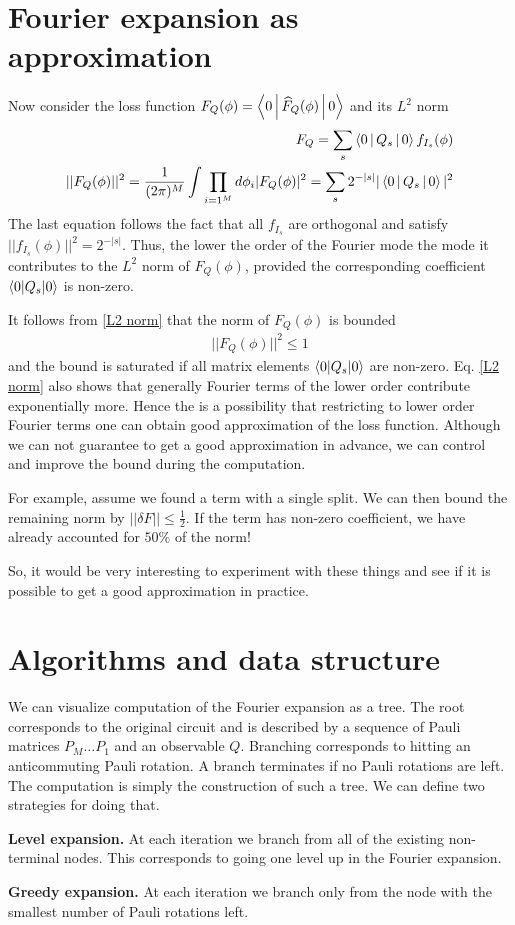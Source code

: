 \documentclass[12 pt]{article}
\begin{document}
\section{Fourier expansion as approximation}
Now consider the loss function $F_Q(\phi)=\Braket{0|\widehat{F}_Q(\phi)|0}$ and its $L^2$ norm
\begin{align}
	F_Q=\sum_s \Braket{0|Q_s|0} f_{I_s}(\phi)\\
	||F_Q(\phi)||^2=\frac{1}{(2\pi)^M}\int \prod_{i=1^M}d\phi_i|F_Q(\phi)|^2=\sum_s 2^{-|s|}|\Braket{0|Q_s|0}|^2  \label{L2 norm}
\end{align}
The last equation follows the fact that all $f_{I_s}$ are orthogonal and satisfy $||f_{I_s}(\phi)||^2=2^{-|s|}$.
Thus, the lower the order of the Fourier mode the mode it contributes to the $L^2$ norm of $F_Q(\phi)$, provided the corresponding coefficient $\braket{0|Q_s|0}$ is non-zero.

It follows from \eqref{L2 norm} that the norm of $F_Q(\phi)$ is bounded 
\begin{align}
	||F_Q(\phi)||^2\le 1
\end{align}
and the bound is saturated if all matrix elements $\braket{0|Q_s|0}$ are non-zero. Eq. \eqref{L2 norm} also shows that generally Fourier terms of the lower order contribute exponentially more. Hence the is a possibility that restricting to lower order Fourier terms one can obtain good approximation of the loss function. Although we can not guarantee to get a good approximation in advance, we can control and improve the bound during the computation.

For example, assume we found a term with a single split. We can then bound the remaining norm by $||\delta F||\le\frac12$. If the term has non-zero coefficient, we have already accounted for $50\%$ of the norm! 

So, it would be very interesting to experiment with these things and see if it is possible to get a good approximation in practice.
\section{Algorithms and data structure}
We can visualize computation of the Fourier expansion as a tree. The root corresponds to the original circuit and is described by a sequence of Pauli matrices $P_M\dots P_1$ and an observable $Q$. Branching corresponds to hitting an anticommuting Pauli rotation. A branch terminates if no Pauli rotations are left. The computation is simply the construction of such a tree. We can define two strategies for doing that.

\textbf{Level expansion.} At each iteration we branch from all of the existing non-terminal nodes. This corresponds to going one level up in the Fourier expansion.

\textbf{Greedy expansion.} At each iteration we branch only from the node with the smallest number of Pauli rotations left.
\end{document}
